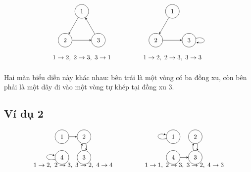 \documentclass[11pt]{article}
\begin{document}
\[
\begin{array}{c@{\qquad\qquad}c}
\begin{tikzpicture}[>=stealth,scale=0.75,every node/.style={font=\small}]
  \node[circle,draw,minimum size=7mm] (a) at (90:1.3) {1};
  \node[circle,draw,minimum size=7mm] (b) at (210:1.3) {2};
  \node[circle,draw,minimum size=7mm] (c) at (330:1.3) {3};
  \draw[->] (a) -- (b);
  \draw[->] (b) -- (c);
  \draw[->] (c) -- (a);
  \node at (0,-1.85) {\(1\to2,\;2\to3,\;3\to1\)};
\end{tikzpicture}
&
\begin{tikzpicture}[>=stealth,scale=0.75,every node/.style={font=\small}]
  \node[circle,draw,minimum size=7mm] (a) at (90:1.3) {1};
  \node[circle,draw,minimum size=7mm] (b) at (210:1.3) {2};
  \node[circle,draw,minimum size=7mm] (c) at (330:1.3) {3};
  \draw[->] (a) -- (b);
  \draw[->] (b) -- (c);
  \draw[->] (c) edge[loop right] (c);
  \node at (0,-1.85) {\(1\to2,\;2\to3,\;3\to3\)};
\end{tikzpicture}
\end{array}
\]

Hai màn biểu diễn này khác nhau: bên trái là một vòng có ba đồng xu, còn bên
phải là một dây đi vào một vòng tự khép tại đồng xu \(3\).

\subsection{Ví dụ 2}

\[
\begin{array}{c@{\qquad\qquad}c}
\begin{tikzpicture}[>=stealth,scale=0.75,every node/.style={font=\small}]
  \node[circle,draw,minimum size=7mm] (a) at (0,1.4) {1};
  \node[circle,draw,minimum size=7mm] (b) at (1.5,1.4) {2};
  \node[circle,draw,minimum size=7mm] (c) at (1.5,0) {3};
  \node[circle,draw,minimum size=7mm] (d) at (0,0) {4};
  \draw[->] (a) -- (b);
  \draw[->] (b) to[bend left=15] (c);
  \draw[->] (c) to[bend left=15] (b);
  \draw[->] (d) edge[loop left] (d);
  \node at (0.75,-0.55) {\(1\to2,\;2\to3,\;3\to2,\;4\to4\)};
\end{tikzpicture}
&
\begin{tikzpicture}[>=stealth,scale=0.75,every node/.style={font=\small}]
  \node[circle,draw,minimum size=7mm] (a) at (0,1.4) {1};
  \node[circle,draw,minimum size=7mm] (b) at (1.5,1.4) {2};
  \node[circle,draw,minimum size=7mm] (c) at (1.5,0) {3};
  \node[circle,draw,minimum size=7mm] (d) at (0,0) {4};
  \draw[->] (a) edge[loop left] (a);
  \draw[->] (b) to[bend left=15] (c);
  \draw[->] (c) to[bend left=15] (b);
  \draw[->] (d) -- (c);
  \node at (0.75,-0.55) {\(1\to1,\;2\to3,\;3\to2,\;4\to3\)};
\end{tikzpicture}
\end{array}
\]
\end{document}
